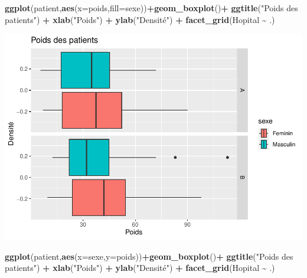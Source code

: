 \documentclass[
]{book}
\newenvironment{Shaded}{\begin{snugshade}}{\end{snugshade}}
\newcommand{\AttributeTok}[1]{\textcolor[rgb]{0.13,0.29,0.53}{#1}}
\newcommand{\FunctionTok}[1]{\textcolor[rgb]{0.13,0.29,0.53}{\textbf{#1}}}
\newcommand{\NormalTok}[1]{#1}
\newcommand{\SpecialCharTok}[1]{\textcolor[rgb]{0.81,0.36,0.00}{\textbf{#1}}}
\newcommand{\StringTok}[1]{\textcolor[rgb]{0.31,0.60,0.02}{#1}}
\begin{document}
\begin{Shaded}
\begin{Highlighting}[]
\FunctionTok{ggplot}\NormalTok{(patient,}\FunctionTok{aes}\NormalTok{(}\AttributeTok{x=}\NormalTok{poids,}\AttributeTok{fill=}\NormalTok{sexe))}\SpecialCharTok{+}\FunctionTok{geom\_boxplot}\NormalTok{()}\SpecialCharTok{+}
  \FunctionTok{ggtitle}\NormalTok{(}\StringTok{"Poids des patients"}\NormalTok{) }\SpecialCharTok{+} 
  \FunctionTok{xlab}\NormalTok{(}\StringTok{"Poids"}\NormalTok{) }\SpecialCharTok{+} 
  \FunctionTok{ylab}\NormalTok{(}\StringTok{"Densité"}\NormalTok{) }\SpecialCharTok{+}
  \FunctionTok{facet\_grid}\NormalTok{(Hopital }\SpecialCharTok{\textasciitilde{}}\NormalTok{ .)}
\end{Highlighting}
\end{Shaded}

\includegraphics{_main_files/figure-latex/ggplot12-1.pdf}

\begin{Shaded}
\begin{Highlighting}[]
\FunctionTok{ggplot}\NormalTok{(patient,}\FunctionTok{aes}\NormalTok{(}\AttributeTok{x=}\NormalTok{sexe,}\AttributeTok{y=}\NormalTok{poids))}\SpecialCharTok{+}\FunctionTok{geom\_boxplot}\NormalTok{()}\SpecialCharTok{+}
  \FunctionTok{ggtitle}\NormalTok{(}\StringTok{"Poids des patients"}\NormalTok{) }\SpecialCharTok{+} 
  \FunctionTok{xlab}\NormalTok{(}\StringTok{"Poids"}\NormalTok{) }\SpecialCharTok{+} 
  \FunctionTok{ylab}\NormalTok{(}\StringTok{"Densité"}\NormalTok{) }\SpecialCharTok{+}
  \FunctionTok{facet\_grid}\NormalTok{(Hopital }\SpecialCharTok{\textasciitilde{}}\NormalTok{ .)}
\end{Highlighting}
\end{Shaded}
\end{document}
